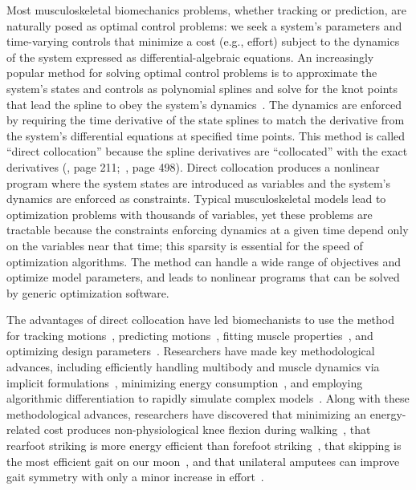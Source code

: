 \documentclass[10pt,letterpaper]{article}
\begin{document}
Most musculoskeletal biomechanics problems, whether tracking or prediction, are naturally posed as optimal control problems: we seek a system’s parameters and time-varying controls that minimize a cost (e.g., effort) subject to the dynamics of the system expressed as differential-algebraic equations. An increasingly popular method for solving optimal control problems is to approximate the system’s states and controls as polynomial splines and solve for the knot points that lead the spline to obey the system’s dynamics~\cite{Betts:2010,Umberger:2018ec,Mombaur:2016eb,Kelly:2017}. The dynamics are enforced by requiring the time derivative of the state splines to match the derivative from the system’s differential equations at specified time points. This method is called “direct collocation” because the spline derivatives are “collocated” with the exact derivatives (\cite{Hairer:1993}, page 211;~\cite{Hairer:1996}, page 498). Direct collocation produces a nonlinear program where the system states are introduced as variables and the system’s dynamics are enforced as constraints. Typical musculoskeletal models lead to optimization problems with thousands of variables, yet these problems are tractable because the constraints enforcing dynamics at a given time depend only on the variables near that time; this sparsity is essential for the speed of optimization algorithms. The method can handle a wide range of objectives and optimize model parameters, and leads to nonlinear programs that can be solved by generic optimization software.

The advantages of direct collocation have led biomechanists to use the method for tracking motions~\cite{Lin:2017jp,Mehrabi:2019}, predicting motions~\cite{Ackermann:2010dd,Miller:2015fc,Porsa:2015dn,Meyer:2016gl,Lee:2016dn,KMoore:2018ea,Lin:2018ex,Lai:2018,Nguyen:2019,Falisse:2019b}, fitting muscle properties~\cite{Falisse:2016}, and optimizing design parameters~\cite{Rohani:2017}. Researchers have made key methodological advances, including efficiently handling multibody and muscle dynamics via implicit formulations~\cite{vandenBogert:2011fv,Groote:2016dq}, minimizing energy consumption~\cite{Koelewijn:2018kw,Koelewijn:2019}, and employing algorithmic differentiation to rapidly simulate complex models~\cite{Falisse:2019a}. Along with these methodological advances, researchers have discovered that minimizing an energy-related cost produces non-physiological knee flexion during walking~\cite{Ackermann:2010dd}, that rearfoot striking is more energy efficient than forefoot striking~\cite{Miller:2015fc}, that skipping is the most efficient gait on our moon~\cite{Ackermann:2012}, and that unilateral amputees can improve gait symmetry with only a minor increase in effort~\cite{Koelewijn:2016bm}.
\end{document}
